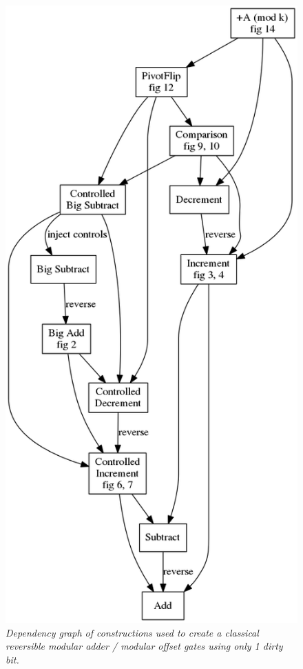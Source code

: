 \documentclass[twocolumn]{article}
\begin{document}
\begin{figure}
  \centering
  \includegraphics[width=\linewidth]{assets/modular-add-graph.png}
  \caption{\em
      Dependency graph of constructions used to create a classical reversible modular adder / modular offset gates using only 1 dirty bit.}
  \label{fig:modular-dependencies}
\end{figure}
\end{document}
